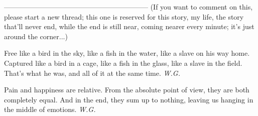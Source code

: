 --------------------------------------------------------------
(If you want to comment on this, please start a new thread; this one is reserved for this story, my life, the story that'll never end, while the end is still near, coming nearer every minute; it's just around the corner...)

Free 
like a bird in the sky, 
like a fish in the water, 
like a slave 
on his way home. 
Captured 
like a bird in a cage, 
like a fish in the glass, 
like a slave in the field. 
That's what he was, 
and all of it 
at the same time. 
\emph{W.G.}

Pain and happiness
are relative. 
From the absolute point of view, 
they are both completely 
equal. 
And in the end, they sum up to nothing, 
leaving us hanging in the middle 
of emotions. 
\emph{W.G.}

